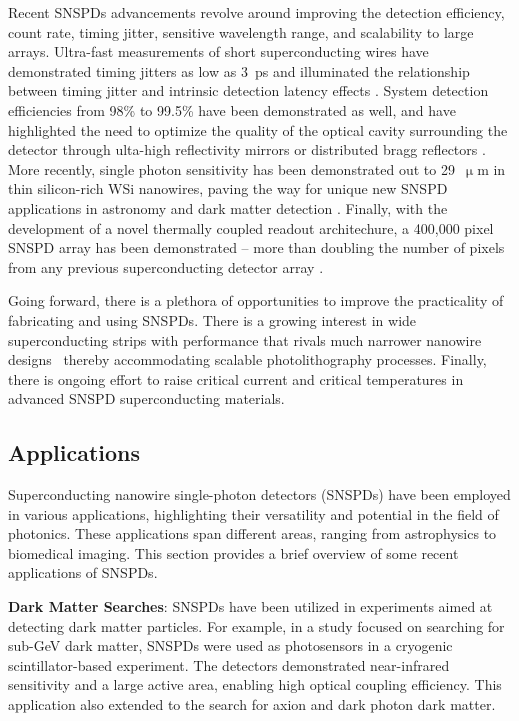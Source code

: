 \documentclass[11pt]{caltech_thesis} %
\begin{document}
Recent SNSPDs advancements revolve around improving the detection efficiency, count rate, timing jitter, sensitive wavelength range, and scalability to large arrays. Ultra-fast measurements of short superconducting wires have demonstrated timing jitters as low as 3~ps and illuminated the relationship between timing jitter and intrinsic detection latency effects \autocite{Korzh2020}. System detection efficiencies from 98\% to 99.5\% have been demonstrated as well, and have highlighted the need to optimize the quality of the optical cavity surrounding the detector through ulta-high reflectivity mirrors or distributed bragg reflectors \autocite{reddy2020superconducting,99.5_Chang_2021}. More recently, single photon sensitivity has been demonstrated out to 29~$\upmu \mathrm{m}$ in thin silicon-rich WSi nanowires, paving the way for unique new SNSPD applications in astronomy and dark matter detection \autocite{taylor2023lownoise}. Finally, with the development of a novel thermally coupled readout architechure, a 400,000 pixel SNSPD array has been demonstrated -- more than doubling the number of pixels from any previous superconducting detector array \autocite{Oripov2023}.

Going forward, there is a plethora of opportunities to improve the practicality of fabricating and using SNSPDs. There is a growing interest in wide superconducting strips with performance that rivals much narrower nanowire designs~\autocite{Yabuno:23} thereby accommodating scalable photolithography processes. Finally, there is ongoing effort to raise critical current and critical temperatures in advanced SNSPD superconducting materials.

\hypertarget{applications}{%
\subsection{Applications}\label{applications}}

Superconducting nanowire single-photon detectors (SNSPDs) have been employed in various applications, highlighting their versatility and potential in the field of photonics. These applications span different areas, ranging from astrophysics to biomedical imaging. This section provides a brief overview of some recent applications of SNSPDs.

\textbf{Dark Matter Searches}: SNSPDs have been utilized in experiments aimed at detecting dark matter particles. For example, in a study focused on searching for sub-GeV dark matter, SNSPDs were used as photosensors in a cryogenic scintillator-based experiment. The detectors demonstrated near-infrared sensitivity and a large active area, enabling high optical coupling efficiency. This application also extended to the search for axion and dark photon dark matter.
\end{document}

